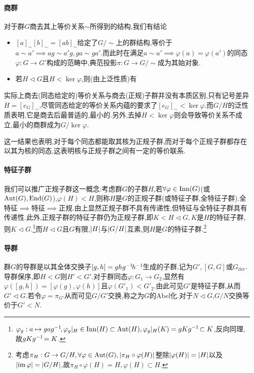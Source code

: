 \documentclass[11pt]{article} %
\begin{document}
\paragraph{商群} %
对于群$G$商去其上等价关系$\sim$所得到的结构,我们有结论
\begin{itemize}
    \item $[a]_{\sim}[b]_{\sim}=[ab]_{\sim}$给定了$G/\sim$上的群结构,等价于$a\sim a'\implies ag\sim a'g, ga\sim ga'$.而此时在满足$a\sim a'\implies\varphi(a)=\varphi(a')$的同态$\varphi:G\to G'$构成的范畴中,典范投影$\pi:G\to G/\sim$成为其始对象.
    \item 若$H\lhd G$且$H<\ker\varphi$,则(由上泛性质)有
\end{itemize}
实际上商去(同态给定的)等价关系与商去(正规)子群并没有本质区别,只有记号差异$H=[e_G]_\sim$,尽管同态给定的等价关系内蕴的要求了$[e_G]_{\sim}<\ker\varphi$.而$G/H$的泛性质表明,它是商去后最普适的,最小的.另外,去掉$H<\ker\varphi$则会导致等价关系不成立,最小的商群成为$G/\ker\varphi$.

这一结果也表明,对于每个同态都能取其核为正规子群,而对于每个正规子群都存在以其为核的同态,这表明核与正规子群之间有一定的等价联系.

\paragraph{特征子群}
我们可以推广正规子群这一概念:考虑群$G$的子群$H$,若$\forall\varphi\in \operatorname{Inn}(G)$(或$\operatorname{Aut}(G), \operatorname{End}(G)$),$\varphi(H)<H$,则称$H$是$G$的正规子群(或特征子群,全特征子群).全特征$\implies$特征$\implies$正规.由上显然正规子群不具有传递性,但特征与全特征子群具有传递性.此外,正规子群的特征子群仍为正规子群,即$K<H\lhd G, K$是$H$的特征子群,则$K\lhd G$.\footnote{$\varphi_g:a\mapsto gag^{-1}\!, \varphi_g|_H\in \operatorname{Inn}(H)\subset \operatorname{Aut}(H), \varphi_g|_H(K)=gKg^{-1}\!\subset K$,反向同理,故$gKg^{-1}\!=K$.}而$H\lhd G$且$G$有限,$\left|H\right|$与$\left|G/H\right|$互素,则$H$是$G$的特征子群.\footnote{考虑$\pi_H:G\to G/H, \forall \varphi\in \operatorname{Aut}(G), \left|\pi_H\circ \varphi(H)\right|$整除$\left|\varphi(H)\right|=\left|H\right|$以及$\left|\operatorname{im}\varphi\right|=\left|G/H\right|$,故$\pi_H\circ\varphi(H)=H,\varphi(H)\subset H$.}

\paragraph{导群}
群$G$的导群是以其全体交换子$[g,h]=ghg^{-1}\! h^{-1}\!$生成的子群,记为$G',[G,G]$或$G_{\text{der}}$.导群保序,即$H<G$则$H'<G'$.对于群同态$\varphi:G_1\to G_2$,显然有$\varphi([g,h])=[\varphi(g),\varphi(h)]$且$\varphi(G'_1)<G'_2$.由此可见$G'$是特征子群,从而$G'\lhd G$.若令$\varphi=\pi_{G'}$从而可见$G/G'$交换,称之为$G$的Abel化.对于$N\lhd G$,$G/N$交换等价于$G'<N$.
\end{document}
